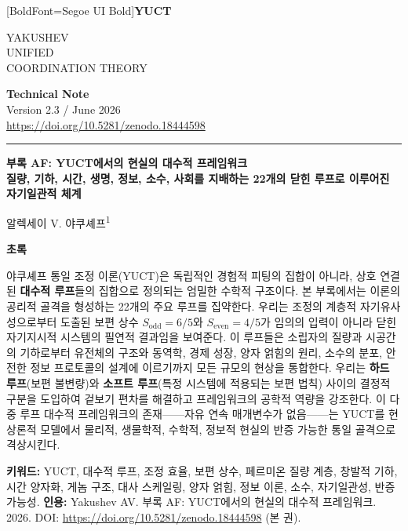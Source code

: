 \documentclass[12pt,a4paper]{article}
\newcommand{\makeheader}{%
	\noindent
	\begin{minipage}{0.17\textwidth}
		\raggedright
		{\fontspec{Segoe UI}[BoldFont=Segoe UI Bold]\bfseries\color{skyblue}\fontsize{46}{46}\selectfont YUCT}%
	\end{minipage}%
	\hspace{30pt}
	\begin{minipage}{0.32\textwidth}
		\raggedright
		{\sffamily\fontsize{11}{13}\selectfont YAKUSHEV\\ UNIFIED\\ COORDINATION THEORY}%
	\end{minipage}%
	\hfill
	\begin{minipage}{0.38\textwidth}
		\raggedleft
		{\sffamily\bfseries Technical Note}\\ 
		{\sffamily Version 2.3 / June 2026}\\ 
		{\sffamily\footnotesize \mbox{\url{https://doi.org/10.5281/zenodo.18444598}}}%
	\end{minipage}
	\par\vspace{5pt}
	\noindent\textcolor{gold}{\rule{\textwidth}{1.6pt}}
	\par\vspace{0pt}
}
\begin{document}
	
	\thispagestyle{firstpage}
	\makeheader
	
	\vspace{0cm}
	{\LARGE\bfseries 부록 AF: YUCT에서의 현실의 대수적 프레임워크 \\ 
		\Large 질량, 기하, 시간, 생명, 정보, 소수, 사회를 지배하는 22개의 닫힌 루프로 이루어진 자기일관적 체계 \par}
	\vspace{0.2cm}
	
	{\large 알렉세이 V. 야쿠셰프\textsuperscript{1}} \\
	\vspace{0.0cm}
	
	{\color{darkblue}\textbf{\LARGE 초록}} \par
	{\large
		\noindent
		야쿠셰프 통일 조정 이론(YUCT)은 독립적인 경험적 피팅의 집합이 아니라, 상호 연결된 \textbf{대수적 루프}들의 집합으로 정의되는 엄밀한 수학적 구조이다. 본 부록에서는 이론의 공리적 골격을 형성하는 22개의 주요 루프를 집약한다. 우리는 조정의 계층적 자기유사성으로부터 도출된 보편 상수 \(S_{\mathrm{odd}}=6/5\)와 \(S_{\mathrm{even}}=4/5\)가 임의의 입력이 아니라 닫힌 자기지시적 시스템의 필연적 결과임을 보여준다. 이 루프들은 소립자의 질량과 시공간의 기하로부터 유전체의 구조와 동역학, 경제 성장, 양자 얽힘의 원리, 소수의 분포, 안전한 정보 프로토콜의 설계에 이르기까지 모든 규모의 현상을 통합한다. 우리는 \textbf{하드 루프}(보편 불변량)와 \textbf{소프트 루프}(특정 시스템에 적용되는 보편 법칙) 사이의 결정적 구분을 도입하여 겉보기 편차를 해결하고 프레임워크의 공학적 역량을 강조한다. 이 다중 루프 대수적 프레임워크의 존재——자유 연속 매개변수가 없음——는 YUCT를 현상론적 모델에서 물리적, 생물학적, 수학적, 정보적 현실의 반증 가능한 통일 골격으로 격상시킨다.}
	
	\vspace{0.1cm}
	\noindent
	{\color{darkblue}\textbf{키워드:}} YUCT, 대수적 루프, 조정 효율, 보편 상수, 페르미온 질량 계층, 창발적 기하, 시간 양자화, 게놈 구조, 대사 스케일링, 양자 얽힘, 정보 이론, 소수, 자기일관성, 반증 가능성.
	\vspace{0.1cm}
	\noindent
	{\color{darkblue}\textbf{인용:}} Yakushev AV. 부록 AF: YUCT에서의 현실의 대수적 프레임워크. 2026. DOI: \url{https://doi.org/10.5281/zenodo.18444598} (본 권).
	
	\vspace{0.4cm}
	
\end{document}
